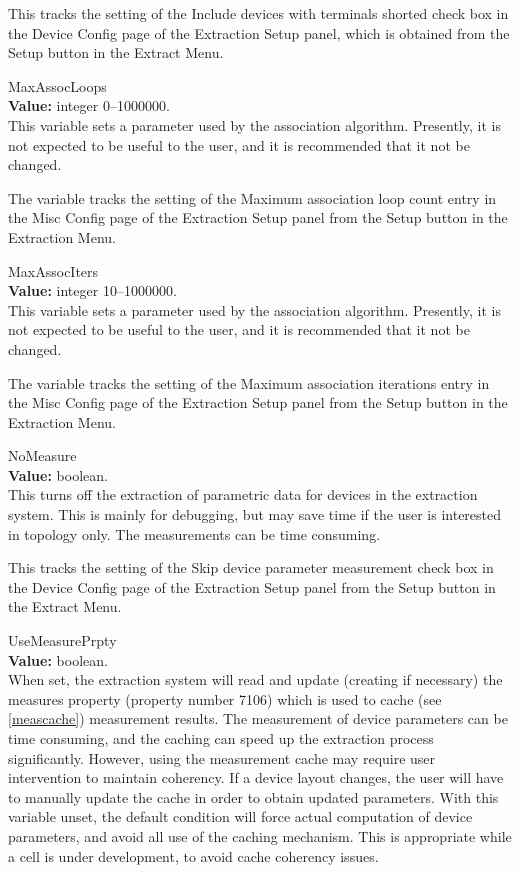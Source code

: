 \begin{description}
This tracks the setting of the {\cb Include devices with terminals
shorted} check box in the {\cb Device Config} page of the {\cb
Extraction Setup} panel, which is obtained from the {\cb Setup} button
in the {\cb Extract Menu}.

\item{\et MaxAssocLoops}\\
{\bf Value:} integer 0--1000000.\\
This variable sets a parameter used by the association algorithm. 
Presently, it is not expected to be useful to the user, and it is
recommended that it not be changed.
 
The variable tracks the setting of the {\cb Maximum association loop
count} entry in the {\cb Misc Config} page of the {\cb Extraction
Setup} panel from the {\cb Setup} button in the {\cb Extraction Menu}.

\item{\et MaxAssocIters}\\
{\bf Value:} integer 10--1000000.\\
This variable sets a parameter used by the association algorithm. 
Presently, it is not expected to be useful to the user, and it is
recommended that it not be changed.
 
The variable tracks the setting of the {\cb Maximum association
iterations} entry in the {\cb Misc Config} page of the {\cb Extraction
Setup} panel from the {\cb Setup} button in the {\cb Extraction Menu}.

\item{\et NoMeasure}\\
{\bf Value:} boolean.\\
This turns off the extraction of parametric data for devices in the
extraction system.  This is mainly for debugging, but may save time if
the user is interested in topology only.  The measurements can be time
consuming.

This tracks the setting of the {\cb Skip device parameter measurement}
check box in the {\cb Device Config} page of the {\cb Extraction
Setup} panel from the {\cb Setup} button in the {\cb Extract Menu}.

\item{\et UseMeasurePrpty}\\
{\bf Value:} boolean.\\
When set, the extraction system will read and update (creating if
necessary) the {\et measures} property (property number 7106) which is
used to cache (see \ref{meascache}) measurement results.  The
measurement of device parameters can be time consuming, and the
caching can speed up the extraction process significantly.  However,
using the measurement cache may require user intervention to maintain
coherency.  If a device layout changes, the user will have to manually
update the cache in order to obtain updated parameters.  With this
variable unset, the default condition will force actual computation of
device parameters, and avoid all use of the caching mechanism.  This
is appropriate while a cell is under development, to avoid cache
coherency issues. 
 

\end{description}
